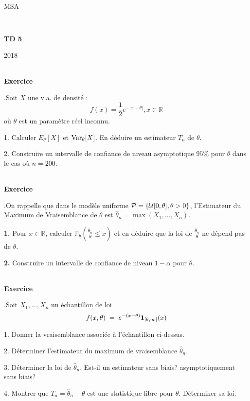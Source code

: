 \documentclass[11pt,a4paper]{article}
\newcommand{\R}{\mathbb{R}}\newcommand{\C}{\mathbb{C}}
\def \R{\mathbb{R}}
\def \P{\mathbb{P}}
\def \Pc{{\cal P}}
\def \Uc{{\cal U}}
\newcounter{exo}
\def\exo{\mbox{}\\[0em]\hspace*{0em}\bf Exercice
\addtocounter{exo}{1}\arabic{exo}.\rm\hspace{1ex}}
\begin{document}
\centerline{\sc MSA}  \centerline{~}
\vskip1cm \centerline{{\bf TD 5}} \centerline{2018}

\exo Soit $X$ une v.a. de densité : $$f(x) = \frac{1}{2}
e^{-|x-\theta|}, x \in  \R$$ où $\theta$ est un paramètre réel
inconnu.

\vspace{2mm}

1. Calculer $E_{\theta}[X]$ et $\hbox{Var}_{\theta}[X]$. En
déduire un estimateur $T_n$ de $\theta$.

\vspace{2mm}

2. Construire un intervalle de confiance de niveau asymptotique
$95\%$ pour $\theta$ dans le cas où $n = 200$.


\exo On rappelle que dans le modèle uniforme $\Pc = \{\Uc [0,
\theta], \theta >0 \}$, l'Estimateur du Maximum de Vraisemblance
de $\theta$ est $\hat \theta_n = \max(X_1,...,X_n).$

\vspace{2mm}

{\bf 1.} Pour $x \in \R$, calculer $\P_{\theta}(\frac{\hat
\theta_n}{\theta} \leq x)$ et en déduire que la loi de $\frac{\hat
\theta_n}{\theta}$ ne dépend pas de $\theta$.

\vspace{2mm}

{\bf 2.} Construire un intervalle de confiance de niveau $1 -
\alpha$ pour $\theta$.

\exo Soit $X_1,...,X_n$ un échantillon de loi
$$ f(x, \theta) \;=\; e^{-(x- \theta)} {\bf 1}_{[\theta, \infty[}(x)$$

\vspace{2mm}

1. Donner la vraisemblance associée à l'échantillon ci-dessus.

\vspace{2mm}

2. Déterminer l'estimateur du maximum de vraisemblance $\hat
\theta_n$.

\vspace{2mm}

3. Déterminer la loi de $\hat \theta_n$. Est-il un estimateur sans
biais? asymptotiquement sans biais?

\vspace{2mm}

4. Montrer que $T_n = \hat \theta_n - \theta$ est une statistique
libre pour $\theta$. Déterminer sa loi.

\vspace{2mm}
\end{document}
